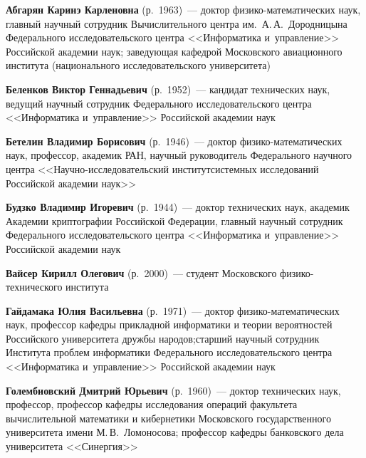 \begin{multicols}{2}

\smallskip  

\noindent
  \textbf{Абгарян Каринэ Карленовна} (р.\ 1963)~--- доктор фи\-зи\-ко-ма\-те\-ма\-ти\-че\-ских 
наук, главный научный сотрудник Вычислительного центра им.\ А.\,А.~Дородни\-цына 
Федерального исследовательского цент\-ра <<Информатика и~управ\-ле\-ние>> Российской 
академии наук; заведующая кафедрой Московского авиационного института (национального 
исследовательского университета)
  
\smallskip  

\noindent
\textbf{Беленков Виктор Геннадьевич} (р.\ 1952)~--- кандидат технических наук, 
ведущий научный сотрудник Федерального исследовательского цент\-ра <<Информатика 
и~управ\-ле\-ние>> Российской академии наук

\smallskip  

\noindent
\textbf{Бетелин Владимир Борисович} (р.\ 1946)~--- доктор фи\-зи\-ко-ма\-те\-ма\-ти\-че\-ских наук, 
профессор, академик РАН, научный руководитель Федерального научного цент\-ра 
<<Научно-исследовательский институт\linebreak сис\-тем\-ных исследований Российской академии \mbox{наук>>}

\smallskip  

\noindent
\textbf{Будзко Владимир Игоревич} (р.\ 1944)~--- доктор технических наук, академик Академии 
криптографии Российской Федерации, главный научный сотрудник Федерального 
исследовательского цент\-ра <<Информатика и~управ\-ле\-ние>> Российской академии \mbox{наук}

\smallskip  

\noindent
\textbf{Вайсер Кирилл Олегович} (р.\ 2000)~--- студент Мос\-ков\-ского фи\-зи\-ко-тех\-ни\-че\-ско\-го 
института

\smallskip  

\noindent
\textbf{Гайдамака Юлия Васильевна} (р.\ 1971)~--- доктор фи\-зи\-ко-ма\-те\-ма\-ти\-че\-ских 
наук, профессор ка\-фед\-ры прикладной информатики и теории ве\-ро\-ят\-но\-стей Российского 
университета дружбы народов;\linebreak старший научный сотрудник Института проб\-лем 
информатики Федерального исследовательского цент\-ра <<Информатика и~управ\-ле\-ние>> 
Российской академии наук

\smallskip  

\noindent
\textbf{Голембиовский Дмитрий Юрьевич} (р.\ 1960)~--- доктор технических наук, профессор, профессор 
кафедры исследования операций факультета вычислительной математики и кибернетики Московского\linebreak 
государственного университета имени М.\,В.~Ломоносова; профессор ка\-фед\-ры банковского дела 
университета <<Синергия>>


\end{multicols}

